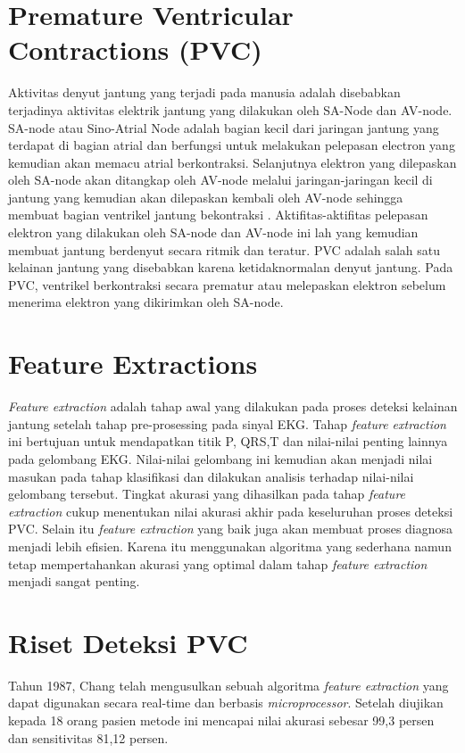 \section{Premature Ventricular Contractions (PVC)}
Aktivitas denyut jantung yang terjadi pada manusia adalah disebabkan terjadinya aktivitas elektrik jantung yang dilakukan oleh SA-Node dan AV-node\cite{heart_act}. SA-node atau Sino-Atrial Node adalah bagian kecil dari jaringan jantung yang terdapat di bagian atrial dan berfungsi untuk melakukan pelepasan electron yang kemudian akan memacu atrial berkontraksi. Selanjutnya elektron yang dilepaskan oleh SA-node akan ditangkap oleh AV-node melalui jaringan-jaringan kecil di jantung yang kemudian akan dilepaskan kembali oleh AV-node sehingga membuat bagian ventrikel jantung bekontraksi \cite{khandait2012}. Aktifitas-aktifitas pelepasan elektron yang dilakukan oleh SA-node dan AV-node ini lah yang kemudian membuat jantung berdenyut secara ritmik dan teratur. PVC adalah salah satu kelainan jantung yang disebabkan karena ketidaknormalan denyut jantung. Pada PVC, ventrikel berkontraksi secara prematur atau melepaskan elektron sebelum menerima elektron yang dikirimkan oleh SA-node\cite{Kanwar2015}.

\section{Feature Extractions}
\textit{Feature extraction} adalah tahap awal yang dilakukan pada proses deteksi kelainan jantung setelah tahap pre-prosessing pada sinyal EKG. Tahap \textit{feature extraction} ini bertujuan untuk mendapatkan titik P, QRS,T dan nilai-nilai penting lainnya pada gelombang EKG. Nilai-nilai gelombang ini kemudian akan menjadi nilai masukan pada tahap klasifikasi dan dilakukan analisis terhadap nilai-nilai gelombang tersebut. Tingkat akurasi yang dihasilkan pada tahap \textit{feature extraction} cukup menentukan nilai akurasi akhir pada keseluruhan proses deteksi PVC\cite{Huang2015Thesis}. Selain itu \textit{feature extraction} yang baik juga akan membuat proses diagnosa menjadi lebih efisien\cite{Karpagachelvi2010,Chang1987,UMaji}. Karena itu menggunakan algoritma yang sederhana namun tetap mempertahankan akurasi yang optimal dalam tahap \textit{feature extraction} menjadi sangat penting.


\section{Riset Deteksi PVC}
Tahun 1987, Chang\cite{Chang1987} telah mengusulkan sebuah algoritma \textit{feature extraction} yang dapat digunakan secara real-time dan berbasis \textit{microprocessor}. Setelah diujikan kepada 18 orang pasien metode ini mencapai nilai akurasi sebesar 99,3 persen dan sensitivitas 81,12 persen.

